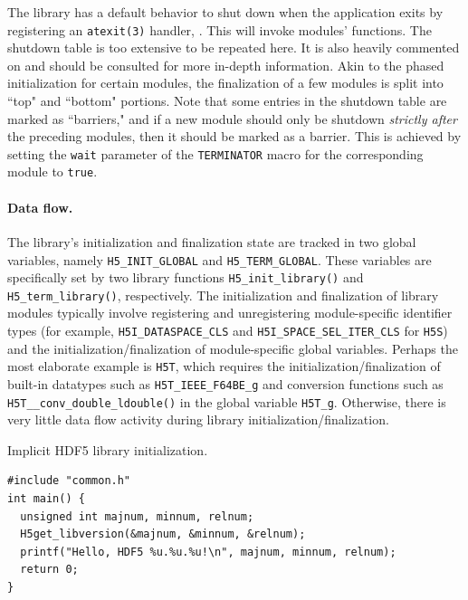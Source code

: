 The library has a default behavior to shut down when the application exits by registering an \texttt{atexit(3)} handler, . This will invoke modules'  functions. The shutdown table is too extensive to be repeated here. It is also heavily commented on and should be consulted for more in-depth information. Akin to the phased initialization for certain modules, the finalization of a few modules is split into ``top" and ``bottom" portions. Note that some entries in the shutdown table are marked as ``barriers," and if a new module should only be shutdown \textit{strictly after} the preceding modules, then it should be marked as a barrier. This is achieved by setting the \texttt{wait} parameter of the \texttt{TERMINATOR} macro for the corresponding module to \texttt{true}.

\paragraph{Data flow.} The library's initialization and finalization state are tracked in two global variables, namely \texttt{H5\_INIT\_GLOBAL} and \texttt{H5\_TERM\_GLOBAL}. These variables are specifically set by two library functions \texttt{H5\_init\_library()} and \texttt{H5\_term\_library()}, respectively. The initialization and finalization of library modules typically involve registering and unregistering module-specific identifier types (for example, \texttt{H5I\_DATASPACE\_CLS} and \texttt{H5I\_SPACE\_SEL\_ITER\_CLS} for \texttt{H5S}) and the initialization/finalization of module-specific global variables. Perhaps the most elaborate example is \texttt{H5T}, which requires the initialization/finalization of built-in datatypes such as \texttt{H5T\_IEEE\_F64BE\_g} and conversion functions such as \texttt{H5T\_\_conv\_double\_ldouble()} in the global variable \texttt{H5T\_g}. Otherwise, there is very little data flow activity during library initialization/finalization.

\begin{listing}
\centering
\caption{Implicit HDF5 library initialization.}
\label{lst:implicit-init}
\begin{verbatim}
#include "common.h"
int main() {
  unsigned int majnum, minnum, relnum;
  H5get_libversion(&majnum, &minnum, &relnum);
  printf("Hello, HDF5 %u.%u.%u!\n", majnum, minnum, relnum);
  return 0;
}
\end{verbatim}
\end{listing}


